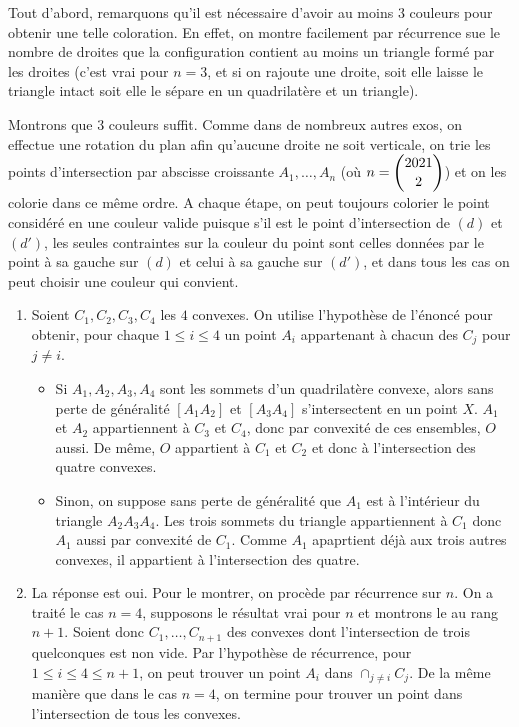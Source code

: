 \begin{sol}
Tout d'abord, remarquons qu'il est nécessaire d'avoir au moins $3$ couleurs pour obtenir une telle coloration. En effet, on montre facilement par récurrence sue le nombre de droites que la configuration contient au moins un triangle formé par les droites (c'est vrai pour $n=3$, et si on rajoute une droite, soit elle laisse le triangle intact soit elle le sépare en un quadrilatère et un triangle).

Montrons que $3$ couleurs suffit. Comme dans de nombreux autres exos, on effectue une rotation du plan afin qu'aucune droite ne soit verticale, on trie les points d'intersection par abscisse croissante $A_1,\ldots,A_n$ (où $n=\dbinom{2021}2$) et on les colorie dans ce même ordre. A chaque étape, on peut toujours colorier le point considéré en une couleur valide puisque s'il est le point d'intersection de $(d)$ et $(d')$, les seules contraintes sur la couleur du point sont celles données par le point à sa gauche sur $(d)$ et celui à sa gauche sur $(d')$, et dans tous les cas on peut choisir une couleur qui convient.
\end{sol}


\begin{sol}
\begin{enumerate}
    \item Soient $C_1,C_2,C_3,C_4$ les $4$ convexes. On utilise l'hypothèse de l'énoncé pour obtenir, pour chaque $1\le i \le 4$ un point $A_i$ appartenant à chacun des $C_j$ pour $j\ne i$.
    \begin{itemize}
        \item Si $A_1,A_2,A_3,A_4$ sont les sommets d'un quadrilatère convexe, alors sans perte de généralité $[A_1A_2]$ et $[A_3A_4]$ s'intersectent en un point $X$. $A_1$ et $A_2$ appartiennent à $C_3$ et $C_4$, donc par convexité de ces ensembles, $O$ aussi. De même, $O$ appartient à $C_1$ et $C_2$ et donc à l'intersection des quatre convexes.
        \item Sinon, on suppose sans perte de généralité que $A_1$ est à l'intérieur du triangle $A_2A_3A_4$. Les trois sommets du triangle appartiennent à $C_1$ donc $A_1$ aussi par convexité de $C_1$. Comme $A_1$ apaprtient déjà aux trois autres convexes, il appartient à l'intersection des quatre.
    \end{itemize}

    \item La réponse est oui. Pour le montrer, on procède par récurrence sur $n$. On a traité le cas $n=4$, supposons le résultat vrai pour $n$ et montrons le au rang $n+1$. Soient donc $C_1,\ldots,C_{n+1}$ des convexes dont l'intersection de trois quelconques est non vide. Par l'hypothèse de récurrence, pour $1\le i\le 4\le n+1$, on peut trouver un point $A_i$ dans $\cap_{j\ne i}C_j$. De la même manière que dans le cas $n=4$, on termine pour trouver un point dans l'intersection de tous les convexes.
\end{enumerate}
\end{sol}


